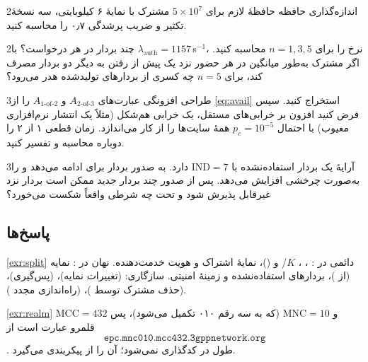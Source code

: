 \documentclass[11pt,a4paper]{article}
\begin{document}
\begin{exercisebox}{2}{اندازه‌گذاری حافظه}\label{exr:storage}
حافظهٔ لازم برای $5\times10^7$ مشترک با نمایهٔ ۶ کیلوبایتی، سه نسخهٔ تکثیر و ضریب پرشدگی ۰٫۷ را محاسبه کنید.
\end{exercisebox}

\begin{exercisebox}{2}{چند بردار در هر درخواست؟}\label{exr:batch}
با $\lambda_{\mathrm{auth}} = 1157$\,s$^{-1}$، نرخ  را برای $n = 1, 3, 5$ محاسبه کنید. اگر مشترک به‌طور میانگین در هر
حضور نزد یک  پیش از رفتن به  دیگر دو بردار مصرف کند، برای $n = 5$ چه کسری از بردارهای تولیدشده
هدر می‌رود؟
\end{exercisebox}

\begin{exercisebox}{3}{طراحی افزونگی}\label{exr:kofn}
عبارت‌های $A_{2\text{-of-}3}$ و $A_{1\text{-of-}2}$ را از \cref{eq:avail} استخراج کنید. سپس فرض کنید افزون بر خرابی‌های
مستقل، یک خرابی هم‌شکل (مثلاً یک انتشار نرم‌افزاری معیوب) با احتمال $p_c = 10^{-5}$ همهٔ سایت‌ها را از کار می‌اندازد.
زمان قطعی ۱ از ۲ را دوباره محاسبه و تفسیر کنید.
\end{exercisebox}

\begin{exercisebox}{3}{آرایهٔ }\label{exr:ind}
 یک بردار استفاده‌نشده با $\mathrm{IND} = 7$ دارد.  به صدور بردار برای  ادامه می‌دهد و
 را به‌صورت چرخشی افزایش می‌دهد. پس از صدور چند بردار جدید ممکن است بردار نزد  غیرقابل پذیرش شود و
تحت چه شرطی واقعاً شکست می‌خورد؟
\end{exercisebox}

\subsection*{پاسخ‌ها}

\begin{solutionbox}{\ref{exr:split}}
دائمی در : ، ، $K$/ و  ()، نمایهٔ اشتراک و هویت 
خدمت‌دهنده. نهان در : نمایه (از )، بردارهای استفاده‌نشده و زمینهٔ امنیتی. سازگاری: 
(تغییرات نمایه)،  (پس‌گیری)،  (حذف مشترک توسط )،  (راه‌اندازی مجدد ).
\end{solutionbox}

\begin{solutionbox}{\ref{exr:realm}}
$\mathrm{MCC} = 432$ و $\mathrm{MNC} = 10$ (که به سه رقم ۰۱۰ تکمیل می‌شود)، پس قلمرو عبارت است از
\[\texttt{epc.mnc010.mcc432.3gppnetwork.org}\]
\cite{ts23003}. طول  در  کدگذاری نمی‌شود؛  آن را از پیکربندی می‌گیرد.
\end{solutionbox}
\end{document}
